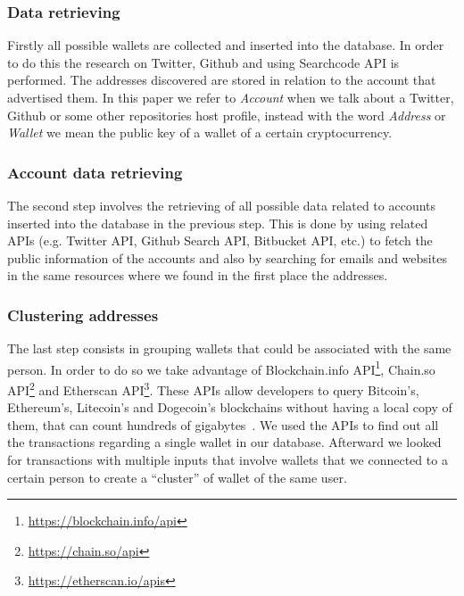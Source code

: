 \subsubsection*{Data retrieving} Firstly all possible wallets are collected
and inserted into the database. In order to do this the research on
Twitter, Github and using Searchcode API is performed. The addresses
discovered are stored in relation to the account that advertised them.
In this paper we refer to \textit{Account} when we talk about a Twitter, Github
or some other repositories host profile, instead with the word \textit{Address}
or \textit{Wallet} we mean the public key of a wallet of a certain
cryptocurrency.
\subsubsection*{Account data retrieving} The second step involves the
retrieving of all possible data related to accounts inserted into the database
in the previous step. This is done by using related APIs
(e.g. Twitter API, Github Search API, Bitbucket API, etc.) to fetch the public
information of the accounts and also by searching for emails and websites in
the same resources where we found in the first place the addresses.

\subsubsection*{Clustering addresses} The last step consists in grouping
wallets that could be associated with the same person. In order to do so we
take advantage of
Blockchain.info API\footnote{\url{https://blockchain.info/api}},
Chain.so API\footnote{\url{https://chain.so/api}} and
Etherscan API\footnote{\url{https://etherscan.io/apis}}. These APIs allow
developers to query Bitcoin's, Ethereum's, Litecoin's and Dogecoin's
blockchains without having a local copy of them, that can count
hundreds of gigabytes~\cite{bib:bitinfochart}. We used the APIs to find out all
the transactions regarding a single wallet in our database.
Afterward we looked for transactions with multiple inputs that
involve wallets that we connected to a certain person to create a
``cluster'' of wallet of the same user.

